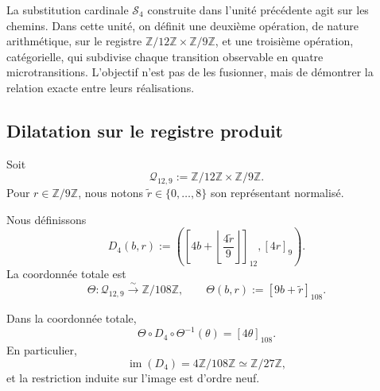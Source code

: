La substitution cardinale \(\mathcal S_4\) construite dans l’unité précédente
agit sur les chemins. Dans cette unité, on définit une deuxième opération, de
nature arithmétique, sur le registre
\(\mathbb Z/12\mathbb Z\times\mathbb Z/9\mathbb Z\), et une troisième
opération, catégorielle, qui subdivise chaque transition observable en quatre
microtransitions. L’objectif n’est pas de les fusionner, mais de démontrer la relation
exacte entre leurs réalisations.

\subsection{Dilatation sur le registre produit}

Soit
\[
 \mathcal Q_{12,9}:=
 \mathbb Z/12\mathbb Z\times\mathbb Z/9\mathbb Z.
\]
Pour \(r\in\mathbb Z/9\mathbb Z\), nous notons
\(\widetilde r\in\{0,\ldots,8\}\) son représentant normalisé.

\begin{definition}
\label{p12-83-c1-s12:def:u006c-dilatacion-registro}
Nous définissons
\begin{equation}
 D_4(b,r):=
 \left(
 \left[
  4b+\left\lfloor\frac{4\widetilde r}{9}\right\rfloor
 \right]_{12},
 [4r]_9
 \right).
 \label{p12-83-c1-s12:eq:u006c-d4-producto}
\end{equation}
La coordonnée totale est
\begin{equation}
 \Theta:\mathcal Q_{12,9}\xrightarrow{\;\sim\;}
 \mathbb Z/108\mathbb Z,
 \qquad
 \Theta(b,r):=[9b+\widetilde r]_{108}.
 \label{p12-83-c1-s12:eq:u006c-coordenada-total}
\end{equation}
\end{definition}

\begin{proposition}
\label{p12-83-c1-s12:prop:u006c-d4-total}
Dans la coordonnée totale,
\begin{equation}
 \boxed{
 \Theta\circ D_4\circ\Theta^{-1}(\theta)=[4\theta]_{108}.}
 \label{p12-83-c1-s12:eq:u006c-d4-total}
\end{equation}
En particulier,
\begin{equation}
 \operatorname{im}(D_4)
 =4\mathbb Z/108\mathbb Z
 \simeq\mathbb Z/27\mathbb Z,
 \label{p12-83-c1-s12:eq:u006c-imagen-d4}
\end{equation}
et la restriction induite sur l’image est d’ordre neuf.
\end{proposition}

